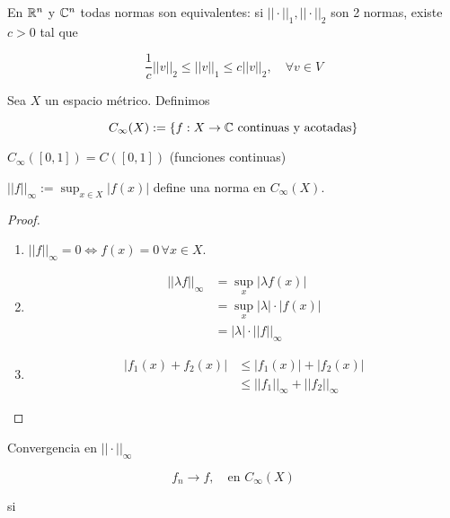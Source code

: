 \documentclass[../Apunte.tex]{subfiles}
\begin{document}
\begin{fproposition}

En $\mathbb{R}^n$ y $\mathbb{C}^n$ todas normas son equivalentes: si $||\cdot||_1,||\cdot||_2$ son 2 normas, existe $c>0$ tal que

\[\frac{1}{c}||v||_2\leq ||v||_1\leq c||v||_2,\quad \forall v\in V\]

\end{fproposition}

\begin{fdefinition}
    Sea $X$ un espacio métrico. Definimos 

    \[C_\infty(X):=\{f:X\to\mathbb{C}\text{ continuas y acotadas}\}\]

\end{fdefinition}

\begin{fexample}
    $C_\infty([0,1]) = C([0,1])$ (funciones continuas)
\end{fexample}

\begin{fproposition}
    $||f||_\infty:=\displaystyle\sup_{x\in X}|f(x)|$ define una norma en $C_\infty(X)$.
\end{fproposition}

\begin{proof}
    \begin{enumerate}
        \item $||f||_\infty=0\iff f(x)=0\, \forall x\in X$.

        \item \begin{align*}||\lambda f||_\infty&=\sup_x |\lambda f(x)|\\
            &=\sup_x |\lambda|\cdot |f(x)|\\
            &=|\lambda|\cdot ||f||_\infty
        \end{align*}

        \item \begin{align*}
            |f_1(x)+f_2(x)|&\leq |f_1(x)|+|f_2(x)|\\
            &\leq ||f_1||_\infty+||f_2||_\infty
        \end{align*}
    \end{enumerate}
\end{proof}

Convergencia en $||\cdot||_\infty$

\[f_n\to f,\quad \text{en }C_\infty(X)\]

si 
\end{document}
